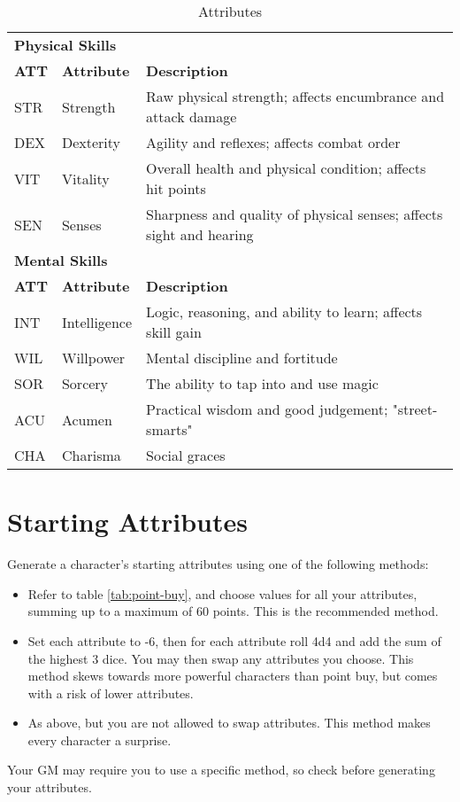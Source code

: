 
\begin{table}[h!]
    \begin{tabular}{l l l}
        \multicolumn{3}{l}{\bfseries{Physical Skills}} \\
        \bfseries{ATT} & \bfseries{Attribute} & \bfseries{Description} \\
        STR & Strength & Raw physical strength; affects encumbrance and attack damage \\
        DEX & Dexterity & Agility and reflexes; affects combat order \\
        VIT & Vitality & Overall health and physical condition; affects hit points \\
        SEN & Senses & Sharpness and quality of physical senses; affects sight and hearing \\
        \multicolumn{3}{l}{\bfseries{Mental Skills}} \\
        \bfseries{ATT} & \bfseries{Attribute} & \bfseries{Description} \\
        INT & Intelligence & Logic, reasoning, and ability to learn; affects skill gain \\
        WIL & Willpower & Mental discipline and fortitude \\
        SOR & Sorcery & The ability to tap into and use magic \\
        ACU & Acumen & Practical wisdom and good judgement; "street-smarts" \\
        CHA & Charisma & Social graces \\
    \end{tabular}
    \caption{Attributes}
    \label{tab:attributes}
\end{table}

\section{Starting Attributes}
Generate a character's starting attributes using one of the following methods:
\begin{itemize}
    \item Refer to table \ref{tab:point-buy}, and choose values for all your
        attributes, summing up to a maximum of 60 points. This is the
        recommended method.
    \item Set each attribute to -6, then for each attribute roll 4d4 and add
        the sum of the highest 3 dice. You may then swap any attributes you
        choose. This method skews towards more powerful characters than
        point buy, but comes with a risk of lower attributes.
    \item As above, but you are not allowed to swap attributes. This method
        makes every character a surprise.
\end{itemize}
Your GM may require you to use a specific method, so check before generating
your attributes.

